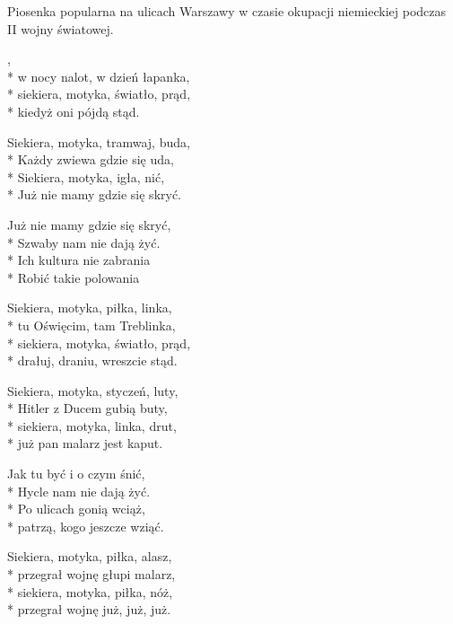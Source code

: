 \begin{info}Piosenka popularna na ulicach Warszawy w czasie okupacji niemieckiej podczas II wojny światowej.\end{info}

\begin{lyrics}[longestline={Siekiera, motyka, bimber, szklanka,}]

,\\*
w nocy nalot, w dzień łapanka,\\*
siekiera, motyka, światło, prąd,\\*
kiedyż oni pójdą stąd.

Siekiera, motyka, tramwaj, buda,\\*
Każdy zwiewa gdzie się uda,\\*
Siekiera, motyka, igła, nić,\\*
Już nie mamy gdzie się skryć.

\vin Już nie mamy gdzie się skryć,\\*
\vin Szwaby nam nie dają żyć.\\*
\vin Ich kultura nie zabrania\\*
\vin Robić takie polowania

Siekiera, motyka, piłka, linka,\\*
tu Oświęcim, tam Treblinka,\\*
siekiera, motyka, światło, prąd,\\*
drałuj, draniu, wreszcie stąd.

Siekiera, motyka, styczeń, luty,\\*
Hitler z Ducem gubią buty,\\*
siekiera, motyka, linka, drut,\\*
już pan malarz jest kaput.

\vin Jak tu być i o czym śnić,\\*
\vin Hycle nam nie dają żyć.\\*
\vin Po ulicach gonią wciąż,\\*
\vin patrzą, kogo jeszcze wziąć.

Siekiera, motyka, piłka, alasz,\\*
przegrał wojnę głupi malarz,\\*
siekiera, motyka, piłka, nóż,\\*
przegrał wojnę już, już, już.
\end{lyrics}



